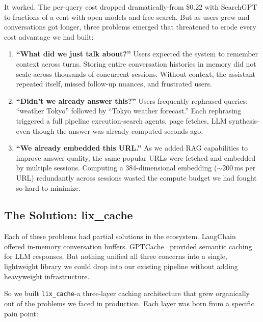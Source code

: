 \documentclass[conference]{IEEEtran}
\begin{document}
It worked. The per-query cost dropped dramatically-from \$0.22 with SearchGPT to fractions of a cent with open models and free search. But as users grew and conversations got longer, three problems emerged that threatened to erode every cost advantage we had built:

\begin{enumerate}
\item \textbf{``What did we just talk about?''} Users expected the system to remember context across turns. Storing entire conversation histories in memory did not scale across thousands of concurrent sessions. Without context, the assistant repeated itself, missed follow-up nuances, and frustrated users.

\item \textbf{``Didn't we already answer this?''} Users frequently rephrased queries: ``weather Tokyo'' followed by ``Tokyo weather forecast.'' Each rephrasing triggered a full pipeline execution-search agents, page fetches, LLM synthesis-even though the answer was already computed seconds ago.

\item \textbf{``We already embedded this URL.''} As we added RAG capabilities to improve answer quality, the same popular URLs were fetched and embedded by multiple sessions. Computing a 384-dimensional embedding (${\sim}200$\,ms per URL) redundantly across sessions wasted the compute budget we had fought so hard to minimize.
\end{enumerate}

\subsection{The Solution: lix\_cache}

Each of these problems had partial solutions in the ecosystem. LangChain~\cite{langchain2023} offered in-memory conversation buffers. GPTCache~\cite{gptcache2023} provided semantic caching for LLM responses. But nothing unified all three concerns into a single, lightweight library we could drop into our existing pipeline without adding heavyweight infrastructure.

So we built \texttt{lix\_cache}-a three-layer caching architecture that grew organically out of the problems we faced in production. Each layer was born from a specific pain point:
\end{document}
